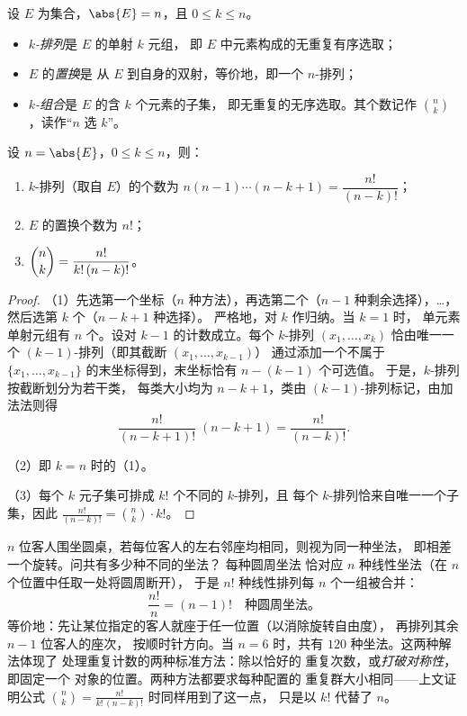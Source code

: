 \begin{definition}[排列、置换与组合]\label{def:b1:counting:objects}
设 $E$ 为集合，$\abs{E} = n$，且 $0 \leq k \leq n$。
\begin{itemize}
  \item \emph{$k$-排列}是 $E$ 的单射 $k$ 元组，
        即 $E$ 中元素构成的无重复有序选取；
  \item $E$ 的\emph{置换}是
        从 $E$ 到自身的双射，等价地，即一个 $n$-排列；
  \item \emph{$k$-组合}是 $E$ 的含 $k$ 个元素的子集，
        即无重复的无序选取。其个数记作
        $\binom{n}{k}$，读作“$n$ 选
        $k$”。
\end{itemize}
\end{definition}

\begin{theorem}[三种计数]\label{thm:b1:counting:counts}
设 $n = \abs{E}$，$0 \leq k \leq n$，则：
\begin{enumerate}
  \item $k$-排列（取自 $E$）的个数为 $n (n-1) \cdots
        (n-k+1) = \dfrac{n!}{(n-k)!}$；
  \item $E$ 的置换个数为 $n!$；
  \item $\dbinom{n}{k} = \dfrac{n!}{k!\,(n-k)!}$。
\end{enumerate}
\end{theorem}

\begin{proof}
（1）先选第一个坐标（$n$ 种方法），再选第二个（$n - 1$
种剩余选择），\dots，然后选第 $k$ 个（$n - k + 1$ 种选择）。
严格地，对 $k$ 作归纳。当 $k = 1$ 时，
单元素单射元组有 $n$ 个。设对 $k - 1$ 的计数成立。每个
$k$-排列 $(x_1, \dots, x_k)$ 恰由唯一一个
$(k-1)$-排列（即其截断 $(x_1, \dots, x_{k-1})$）
通过添加一个不属于 $\{x_1, \dots,
x_{k-1}\}$ 的末坐标得到，末坐标恰有 $n - (k - 1)$ 个可选值。
于是，$k$-排列按截断划分为若干类，
每类大小均为 $n - k + 1$，类由
$(k-1)$-排列标记，由加法法则得
\[
\frac{n!}{(n-k+1)!}\;(n - k + 1) = \frac{n!}{(n-k)!} .
\]

（2）即 $k = n$ 时的（1）。

（3）每个 $k$ 元子集可排成 $k!$ 个不同的 $k$-排列，且
每个 $k$-排列恰来自唯一一个子集，因此
$\frac{n!}{(n-k)!} = \binom nk \cdot k!$。
\end{proof}

\begin{example}[圆桌：对对称性取商]\label{ex:b1:counting:roundtable}
$n$ 位客人围坐圆桌，若每位客人的左右邻座均相同，则视为同一种坐法，
即相差一个旋转。问共有多少种不同的坐法？
每种圆周坐法
恰对应 $n$ 种线性坐法（在 $n$ 个位置中任取一处将圆周断开），
于是 $n!$ 种线性排列每
$n$ 个一组被合并：
\[
\frac{n!}{n} = (n-1)! \quad\text{种圆周坐法。}
\]
等价地：先让某位指定的客人就座于任一位置（以消除旋转自由度），
再排列其余 $n - 1$ 位客人的座次，
按顺时针方向。当 $n = 6$ 时，共有 $120$ 种坐法。这两种解法体现了
处理重复计数的两种标准方法：除以恰好的
重复次数，或\emph{打破对称性}，即固定一个
对象的位置。两种方法都要求每种配置的
重复群大小相同——上文证明公式
$\binom nk = \frac{n!}{k!\,(n-k)!}$ 时同样用到了这一点，
只是以 $k!$ 代替了 $n$。
\end{example}

